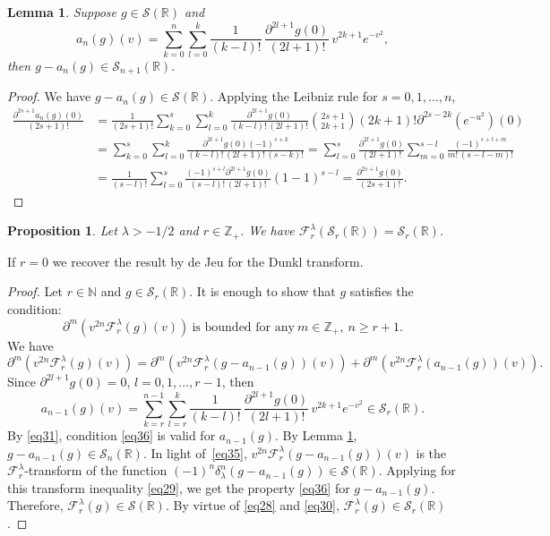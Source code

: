 \documentclass[12pt,twoside,reqno]{amsart}\usepackage[cp1251]{inputenc}
\theoremstyle{plain}
\newtheorem{lemma}[theorem]{Lemma}
\newtheorem{proposition}[theorem]{Proposition}
\theoremstyle{remark}
\begin{document}
\begin{lemma}\label{lem10}
Suppose $g\in \mathcal{S}(\mathbb{R})$ and
\[
a_n(g)(v)=\sum_{k=0}^n\sum_{l=0}^k\frac{1}{(k-l)!}\,\frac{\partial^{2l+1}g(0)}{(2l+1)!}\,v^{2k+1}e^{-v^2},
\]
then $g-a_n(g)\in\mathcal{S}_{n+1}(\mathbb{R})$.
\end{lemma}

\begin{proof} We have $g-a_n(g)\in\mathcal{S}(\mathbb{R})$.
Applying
the  Leibniz rule
for $s=0,1,\dots,n$,
\begin{align*}
\frac{\partial^{2s+1}a_n(g)(0)}{(2s+1)!}&=\frac{1}{(2s+1)!}\sum_{k=0}^s\sum_{l=0}^k\frac{\partial^{2l+1}g(0)}{(k-l)!\,(2l+1)!}
\binom{2s+1}{2k+1}(2k+1)!\partial^{2s-2k}(e^{-u^2})(0)\\
&=\sum_{k=0}^s\sum_{l=0}^k\frac{\partial^{2l+1}g(0)(-1)^{s+k}}{(k-l)!\,(2l+1)!\,(s-k)!}
=
\sum_{l=0}^s\frac{\partial^{2l+1}g(0)}{(2l+1)!}\sum_{m=0}^{s-l}\frac{(-1)^{s+l+m}}{m!\,(s-l-m)!}
\\
&=\frac{1}{(s-l)!}\sum_{l=0}^s\frac{(-1)^{s+l}\partial^{2l+1}g(0)}{(s-l)!\,(2l+1)!}(1-1)^{s-l}=\frac{\partial^{2s+1}g(0)}{(2s+1)!}.
\end{align*}
\end{proof}

\begin{proposition}\label{lem11} Let
$\lambda>-1/2$ and $r\in\mathbb{Z}_+$.
We have  $\mathcal{F}_{r}^{\lambda}(\mathcal{S}_{r}(\mathbb{R}))=\mathcal{S}_{r}(\mathbb{R})$.
\end{proposition}
If $r=0$ we recover the result by de Jeu \cite{jeu} for the Dunkl transform.

\begin{proof} Let $r\in\mathbb{N}$ and $g\in \mathcal{S}_{r}(\mathbb{R})$. It is enough to show that  $g$ satisfies the condition:
\begin{equation}\label{eq36}
\partial^{m}(v^{2n}\mathcal{F}_{r}^{\lambda}(g)(v))\ \text{is bounded for any}\ m\in\mathbb{Z}_+,\ n\ge r+1.
\end{equation}
We have
\[
\partial^{m}(v^{2n}\mathcal{F}_{r}^{\lambda}(g)(v))=\partial^{m}(v^{2n}\mathcal{F}_{r}^{\lambda}(g-a_{n-1}(g))(v))
+\partial^{m}(v^{2n}\mathcal{F}_{r}^{\lambda}(a_{n-1}(g))(v)).
\]
Since  $\partial^{2l+1}g(0)=0$, $l=0,1,\dots,r-1$, then
\[
a_{n-1}(g)(v)=\sum_{k=r}^{n-1}\sum_{l=r}^k\frac{1}{(k-l)!}\,
\frac{\partial^{2l+1}g(0)}{(2l+1)!}\,v^{2k+1}e^{-v^2}\in\mathcal{S}_{r}(\mathbb{R}).
\]
By  \eqref{eq31}, condition  \eqref{eq36} is valid for $a_{n-1}(g)$. By Lemma \ref{lem10}, $g-a_{n-1}(g)\in \mathcal{S}_n(\mathbb{R})$.
In light of~\eqref{eq35}, $v^{2n}\mathcal{F}_{r}^{\lambda}(g-a_{n-1}(g))(v)$ is the  $\mathcal{F}_{r}^{\lambda}$-transform of the function
$(-1)^n\delta_{\lambda}^n(g-a_{n-1}(g))\in \mathcal{S}(\mathbb{R})$. Applying for this transform inequality \eqref{eq29}, we get the property \eqref{eq36} for  $g-a_{n-1}(g)$. Therefore, $\mathcal{F}_{r}^{\lambda}(g)\in\mathcal{S}(\mathbb{R})$. By virtue of \eqref{eq28} and \eqref{eq30}, $\mathcal{F}_{r}^{\lambda}(g)\in\mathcal{S}_{r}(\mathbb{R})$.
\end{proof}
\end{document}
